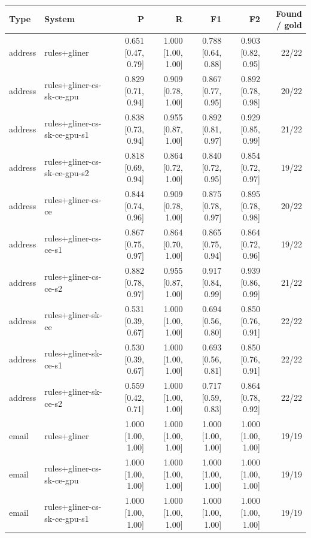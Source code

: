 \providecommand{\ci}[2]{{\scriptsize [#1, #2]}}

\begin{table}[htbp]
\centering
\small
\begin{tabular}{llrrrrr}
\toprule
Type & System & P & R & F1 & F2 & Found / gold \\
\midrule
address & rules+gliner & 0.651 \ci{0.47}{0.79} & 1.000 \ci{1.00}{1.00} & 0.788 \ci{0.64}{0.88} & 0.903 \ci{0.82}{0.95} & 22/22 \\
address & rules+gliner-cs-sk-ce-gpu & 0.829 \ci{0.71}{0.94} & 0.909 \ci{0.78}{1.00} & 0.867 \ci{0.77}{0.95} & 0.892 \ci{0.78}{0.98} & 20/22 \\
address & rules+gliner-cs-sk-ce-gpu-s1 & 0.838 \ci{0.73}{0.94} & 0.955 \ci{0.87}{1.00} & 0.892 \ci{0.81}{0.97} & 0.929 \ci{0.85}{0.99} & 21/22 \\
address & rules+gliner-cs-sk-ce-gpu-s2 & 0.818 \ci{0.69}{0.94} & 0.864 \ci{0.72}{1.00} & 0.840 \ci{0.72}{0.95} & 0.854 \ci{0.72}{0.97} & 19/22 \\
address & rules+gliner-cs-ce & 0.844 \ci{0.74}{0.96} & 0.909 \ci{0.78}{1.00} & 0.875 \ci{0.78}{0.97} & 0.895 \ci{0.78}{0.98} & 20/22 \\
address & rules+gliner-cs-ce-s1 & 0.867 \ci{0.75}{0.97} & 0.864 \ci{0.70}{1.00} & 0.865 \ci{0.75}{0.94} & 0.864 \ci{0.72}{0.96} & 19/22 \\
address & rules+gliner-cs-ce-s2 & 0.882 \ci{0.78}{0.97} & 0.955 \ci{0.87}{1.00} & 0.917 \ci{0.84}{0.99} & 0.939 \ci{0.86}{0.99} & 21/22 \\
address & rules+gliner-sk-ce & 0.531 \ci{0.39}{0.67} & 1.000 \ci{1.00}{1.00} & 0.694 \ci{0.56}{0.80} & 0.850 \ci{0.76}{0.91} & 22/22 \\
address & rules+gliner-sk-ce-s1 & 0.530 \ci{0.39}{0.67} & 1.000 \ci{1.00}{1.00} & 0.693 \ci{0.56}{0.81} & 0.850 \ci{0.76}{0.91} & 22/22 \\
address & rules+gliner-sk-ce-s2 & 0.559 \ci{0.42}{0.71} & 1.000 \ci{1.00}{1.00} & 0.717 \ci{0.59}{0.83} & 0.864 \ci{0.78}{0.92} & 22/22 \\
email & rules+gliner & 1.000 \ci{1.00}{1.00} & 1.000 \ci{1.00}{1.00} & 1.000 \ci{1.00}{1.00} & 1.000 \ci{1.00}{1.00} & 19/19 \\
email & rules+gliner-cs-sk-ce-gpu & 1.000 \ci{1.00}{1.00} & 1.000 \ci{1.00}{1.00} & 1.000 \ci{1.00}{1.00} & 1.000 \ci{1.00}{1.00} & 19/19 \\
email & rules+gliner-cs-sk-ce-gpu-s1 & 1.000 \ci{1.00}{1.00} & 1.000 \ci{1.00}{1.00} & 1.000 \ci{1.00}{1.00} & 1.000 \ci{1.00}{1.00} & 19/19 \\

\end{tabular}
\end{table}

